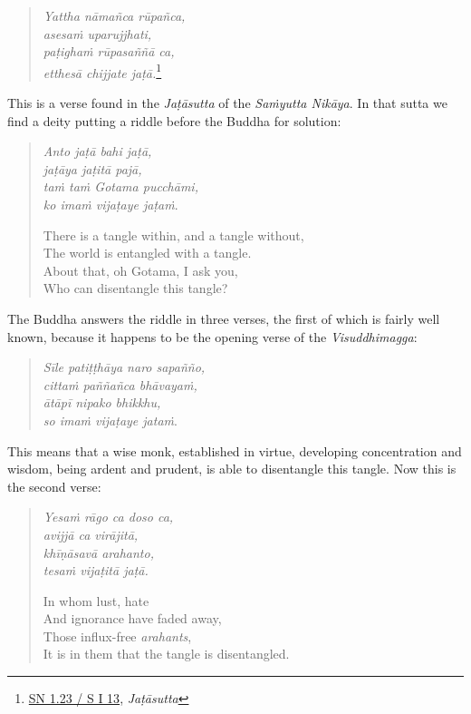 \begin{quote}
\emph{Yattha nāmañca rūpañca,}\\
\emph{asesaṁ uparujjhati,}\\
\emph{paṭighaṁ rūpasaññā ca,}\\
\emph{etthesā chijjate jaṭā.}\footnote{\href{https://suttacentral.net/sn1.23/pli/ms}{SN 1.23 / S I 13}, \emph{Jaṭāsutta}}
\end{quote}

This is a verse found in the \emph{Jaṭāsutta} of the \emph{Saṁyutta Nikāya}. In that sutta we find a deity putting a riddle before the Buddha for solution:

\begin{quote}
\emph{Anto jaṭā bahi jaṭā,}\\
\emph{jaṭāya jaṭitā pajā,}\\
\emph{taṁ taṁ Gotama pucchāmi,}\\
\emph{ko imaṁ vijaṭaye jaṭaṁ}.

There is a tangle within, and a tangle without,\\
The world is entangled with a tangle.\\
About that, oh Gotama, I ask you,\\
Who can disentangle this tangle?
\end{quote}

The Buddha answers the riddle in three verses, the first of which is fairly well known, because it happens to be the opening verse of the \emph{Visuddhimagga}:

\begin{quote}
\emph{Sīle patiṭṭhāya naro sapañño,}\\
\emph{cittaṁ paññañca bhāvayaṁ,}\\
\emph{ātāpī nipako bhikkhu,}\\
\emph{so imaṁ vijaṭaye jataṁ}.
\end{quote}

This means that a wise monk, established in virtue, developing concentration and wisdom, being ardent and prudent, is able to disentangle this tangle. Now this is the second verse:

\clearpage

\begin{quote}
\emph{Yesaṁ rāgo ca doso ca,}\\
\emph{avijjā ca virājitā,}\\
\emph{khīṇāsavā arahanto,}\\
\emph{tesaṁ vijaṭitā jaṭā.}

In whom lust, hate\\
And ignorance have faded away,\\
Those influx-free \emph{arahants},\\
It is in them that the tangle is disentangled.
\end{quote}

